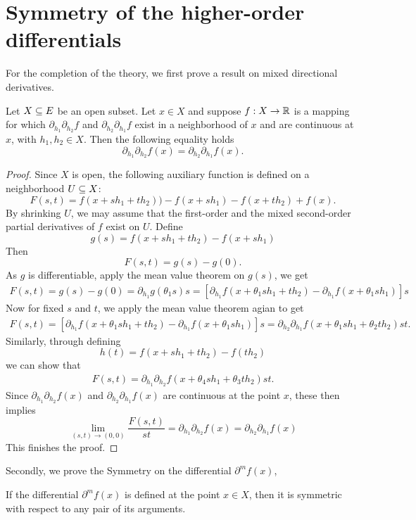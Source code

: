 \section{Symmetry of the higher-order differentials}
For the completion of the theory, we first prove a result on mixed directional derivatives.
\begin{theorem}\label{diff symetric order 2}
Let $X\subseteq E$ be an open subset. Let $x\in X$ and suppose $f:X\to\mathbb{R}$ is a mapping for which $\partial_{h_1}\partial_{h_2}f$ and $\partial_{h_2}\partial_{h_1}f$ exist in a neighborhood of $x$ and are continuous at $x$, with $h_1,h_2\in X$. Then the following equality holds
\[\partial_{h_1}\partial_{h_2}f(x)=\partial_{h_2}\partial_{h_1}f(x).\]
\end{theorem}
\begin{proof}
Since $X$ is open, the following auxiliary function is defined on a neighborhood $U\subseteq X$:
\[F(s,t)=f(x+sh_1+th_2))-f(x+sh_1)-f(x+th_2)+f(x).\]
By shrinking $U$, we may assume that the first-order and the mixed second-order
partial derivatives of $f$ exist on $U$. Define
\[g(s)=f(x+sh_1+th_2)-f(x+sh_1)\]
Then
\[F(s,t)=g(s)-g(0).\]
As $g$ is differentiable, apply the mean value theorem on $g(s)$, we get
\begin{align}\label{Schwarz-1}
F(s,t)=g(s)-g(0)=\partial_{h_1}g(\theta_1s)s=[\partial_{h_1}f(x+\theta_1sh_1+th_2)-\partial_{h_1}f(x+\theta_1sh_1)]s
\end{align}
Now for fixed $s$ and $t$, we apply the mean value theorem agian to get
\begin{align}\label{Schwarz-2}
F(s,t)=[\partial_{h_1}f(x+\theta_1sh_1+th_2)-\partial_{h_1}f(x+\theta_1sh_1)]s=\partial_{h_2}\partial_{h_1}f(x+\theta_1sh_1+\theta_2th_2)st.
\end{align}
Similarly, through defining
\[h(t)=f(x+sh_1+th_2)-f(th_2)\]
we can show that
\begin{align}\label{Schwarz-3}
F(s,t)=\partial_{h_1}\partial_{h_2}f(x+\theta_4sh_1+\theta_3th_2)st.
\end{align}
Since $\partial_{h_1}\partial_{h_2}f(x)$ and $\partial_{h_2}\partial_{h_1}f(x)$ are continuous at the point $x$, these then implies
\[\lim_{(s,t)\to(0,0)}\frac{F(s,t)}{st}=\partial_{h_1}\partial_{h_2}f(x)=\partial_{h_2}\partial_{h_1}f(x)\]
This finishes the proof.
\end{proof}
Secondly, we prove the Symmetry on the differential $\partial^mf(x)$,
\begin{theorem}\label{diff symetric order n}
If the differential $\partial^mf(x)$ is defined at the point $x\in X$, then it is symmetric with respect to any pair of its arguments.
\end{theorem}
